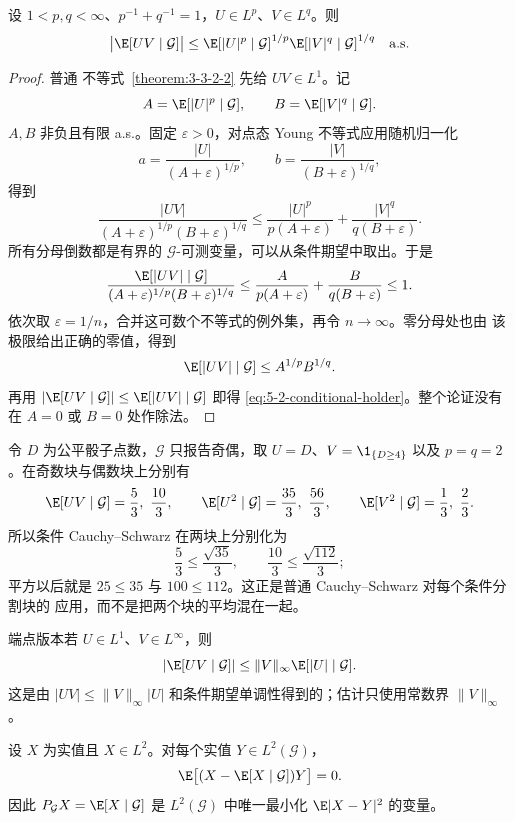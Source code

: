 \begin{proposition}[条件 \Holder{}]\label{proposition:5-2-3-holder}
设 $1<p,q<\infty$、$p^{-1}+q^{-1}=1$，$U\in L^p$、$V\in L^q$。则
\begin{equation}\label{eq:5-2-conditional-holder}
 \bigl|\E[UV\mid\mathcal G]\bigr|
 \leq
 \E[|U|^p\mid\mathcal G]^{1/p}
 \E[|V|^q\mid\mathcal G]^{1/q}
 \quad\text{a.s.}
\end{equation}
\end{proposition}

\begin{proof}
普通 \Holder{} 不等式~\ref{theorem:3-3-2-2} 先给 $UV\in L^1$。记
\[
 A=\E[|U|^p\mid\mathcal G],
 \qquad B=\E[|V|^q\mid\mathcal G].
\]
$A,B$ 非负且有限 a.s.。固定 $\varepsilon>0$，对点态 Young 不等式应用随机归一化
\[
 a=\frac{|U|}{(A+\varepsilon)^{1/p}},
 \qquad
 b=\frac{|V|}{(B+\varepsilon)^{1/q}},
\]
得到
\[
 \frac{|UV|}{(A+\varepsilon)^{1/p}(B+\varepsilon)^{1/q}}
 \leq
 \frac{|U|^p}{p(A+\varepsilon)}
 +\frac{|V|^q}{q(B+\varepsilon)}.
\]
所有分母倒数都是有界的 $\mathcal G$-可测变量，可以从条件期望中取出。于是
\[
 \frac{\E[|UV|\mid\mathcal G]}
 {(A+\varepsilon)^{1/p}(B+\varepsilon)^{1/q}}
 \leq\frac{A}{p(A+\varepsilon)}+\frac{B}{q(B+\varepsilon)}\leq1.
\]
依次取 $\varepsilon=1/n$，合并这可数个不等式的例外集，再令 $n\to\infty$。零分母处也由
该极限给出正确的零值，得到
\[
 \E[|UV|\mid\mathcal G]\leq A^{1/p}B^{1/q}.
\]
再用
$|\E[UV\mid\mathcal G]|\leq\E[|UV|\mid\mathcal G]$ 即得
\eqref{eq:5-2-conditional-holder}。整个论证没有在 $A=0$ 或 $B=0$ 处作除法。
\end{proof}

\begin{example}
令 $D$ 为公平骰子点数，$\mathcal G$ 只报告奇偶，取
$U=D$、$V=\1_{\{D\geq4\}}$ 以及 $p=q=2$。在奇数块与偶数块上分别有
\[
 \E[UV\mid\mathcal G]=\frac53,\ \frac{10}{3},\qquad
 \E[U^2\mid\mathcal G]=\frac{35}{3},\ \frac{56}{3},\qquad
 \E[V^2\mid\mathcal G]=\frac13,\ \frac23.
\]
所以条件 Cauchy--Schwarz 在两块上分别化为
\[
 \frac53\leq\frac{\sqrt{35}}3,\qquad
 \frac{10}{3}\leq\frac{\sqrt{112}}3;
\]
平方以后就是 $25\leq35$ 与 $100\leq112$。这正是普通 Cauchy--Schwarz 对每个条件分割块的
应用，而不是把两个块的平均混在一起。
\end{example}

端点版本若 $U\in L^1$、$V\in L^\infty$，则
\[
 |\E[UV\mid\mathcal G]|
 \leq\|V\|_\infty\E[|U|\mid\mathcal G].
\]
这是由 $|UV|\leq\|V\|_\infty|U|$ 和条件期望单调性得到的；估计只使用常数界
$\|V\|_\infty$。

\begin{theorem}[$L^2$ 投影性质]\label{theorem:5-2-3-2}
设 $X$ 为实值且 $X\in L^2$。对每个实值 $Y\in L^2(\mathcal G)$，
\begin{equation}\label{eq:5-2-orthogonality}
 \E\bigl[(X-\E[X\mid\mathcal G])Y\bigr]=0.
\end{equation}
因此 $P_{\mathcal G}X=\E[X\mid\mathcal G]$ 是 $L^2(\mathcal G)$ 中唯一最小化
$\E|X-Y|^2$ 的变量。
\end{theorem}


